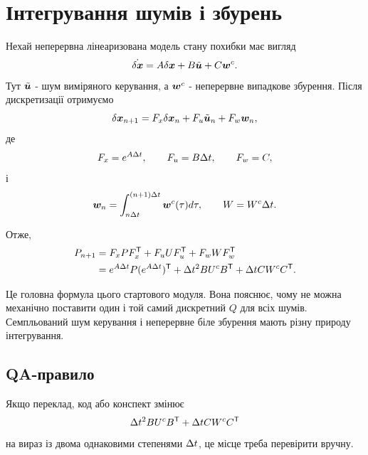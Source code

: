 \section{Інтегрування шумів і збурень}

Нехай неперервна лінеаризована модель стану похибки має вигляд
\[
\dot{\delta\bm{x}}=A\delta\bm{x}+B\tilde{\bm{u}}+C\bm{w}^c.
\]
Тут $\tilde{\bm{u}}$ - шум виміряного керування, а $\bm{w}^c$ - неперервне випадкове збурення. Після дискретизації отримуємо
\[
\delta\bm{x}_{n+1}=F_x\delta\bm{x}_n+F_u\tilde{\bm{u}}_n+F_w\bm{w}_n,
\]
де
\[
F_x=e^{A\Delta t},\qquad F_u=B\Delta t,
\qquad F_w=C,
\]
і
\[
\bm{w}_n=\int_{n\Delta t}^{(n+1)\Delta t}\bm{w}^c(\tau)d\tau,
\qquad
W=W^c\Delta t.
\]

Отже,
\begin{align}
P_{n+1}
&=F_xPF_x^{\mathsf{T}}+F_uUF_u^{\mathsf{T}}+F_wWF_w^{\mathsf{T}}\\
&=e^{A\Delta t}P(e^{A\Delta t})^{\mathsf{T}}+\Delta t^2BU^cB^{\mathsf{T}}+\Delta t CW^cC^{\mathsf{T}}.
\end{align}

Це головна формула цього стартового модуля. Вона пояснює, чому не можна механічно поставити один і той самий дискретний $Q$ для всіх шумів. Семпльований шум керування і неперервне біле збурення мають різну природу інтегрування.

\subsection{QA-правило}

Якщо переклад, код або конспект змінює
\[
\Delta t^2BU^cB^{\mathsf{T}}+\Delta t CW^cC^{\mathsf{T}}
\]
на вираз із двома однаковими степенями $\Delta t$, це місце треба перевірити вручну.
